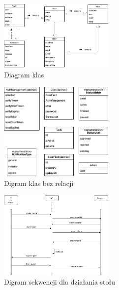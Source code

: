 \begin{figure}[h!]
  \centering
    \includegraphics[width=0.5\textwidth]{images/diagrams/class_diagram.png}
  \caption{Diagram klas}
  \label{fig:mobile}
\end{figure}

\begin{figure}[h!]
  \centering
    \includegraphics[width=0.5\textwidth]{images/diagrams/class_diagram_rest.png}
  \caption{Digram klas bez relacji}
  \label{fig:mobile}
\end{figure}

\begin{figure}[h!]
  \centering
    \includegraphics[width=0.5\textwidth]{images/diagrams/match_event_flow.png}
  \caption{Digram sekwencji dla działania stołu}
  \label{fig:mobile}
\end{figure}

\begin{center}
  \end{center}

